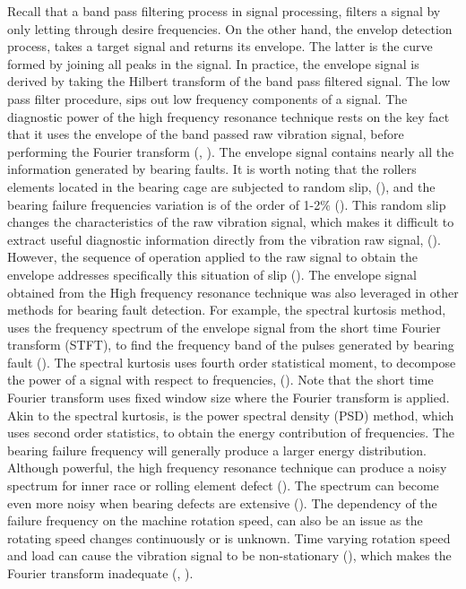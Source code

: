 \documentclass[../Main/thesis.tex]{subfiles}
\begin{document}
 \justify
  Recall that a band pass filtering process in signal processing, filters a signal by only letting through desire frequencies. On the other hand, the envelop detection process, takes a target signal and returns its envelope. The latter is the curve formed by joining all peaks in the signal. In practice, the envelope signal is derived by taking the Hilbert transform of the band pass filtered signal. The low pass filter procedure, sips out low frequency components of a signal.
\justify
The diagnostic power of the high frequency resonance technique rests on the key fact that it uses the envelope of the band passed raw vibration signal, before performing the Fourier transform (\cite{mcfadden1984a}, \cite{randal2010}). The envelope signal contains nearly all the information generated by bearing faults. It is worth noting that the rollers elements located in the bearing cage are subjected to random slip, (\cite{mcfadden1984a}), and the bearing failure frequencies variation is of the order of 1-2$\%$ (\cite{randal2010}). This random slip changes the characteristics of the raw vibration signal, which makes it difficult to extract useful diagnostic information directly from the vibration raw signal, (\cite{randal2010}). However, the sequence of operation applied to the raw signal to obtain the envelope addresses specifically this situation of slip  (\cite{randal2010}). 
\justify
The envelope signal obtained from the High frequency resonance technique was also leveraged in other methods for bearing fault detection. For example, the spectral kurtosis method, uses the frequency spectrum of the envelope signal from the short time Fourier transform (STFT), to find the frequency band of the pulses generated by bearing fault (\cite{randal2010}). The spectral kurtosis uses fourth order statistical moment, to decompose the power of a signal with respect to frequencies, (\cite{randal2010}). Note that the short time Fourier transform uses fixed window size where the Fourier transform is applied. Akin to the spectral kurtosis, is the power spectral density (PSD) method, which uses second order statistics, to obtain the energy contribution of frequencies. The bearing failure frequency will generally produce a larger energy distribution.
\justify
 Although powerful, the high frequency resonance technique can produce a noisy spectrum for inner race or rolling element defect (\cite{mcfadden1984a}). The spectrum can become even more noisy when bearing defects are extensive (\cite{mcfadden1984a}). The dependency of the failure frequency on the machine rotation speed, can also be an issue as the rotating speed changes continuously or is unknown. Time varying rotation speed and load can cause the vibration signal to be non-stationary (\cite{zhao2014}), which makes the Fourier transform inadequate (\cite{huang98}, \cite{huang08}).
\end{document}
